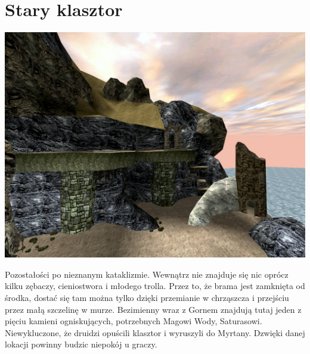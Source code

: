 \documentclass[11pt,polish, openany]{book}
\begin{document}
\section{Stary klasztor}
\begin{center}
	\includegraphics[scale=0.25]{twojastara-klasztor}
\end{center}
Pozostałości po nieznanym kataklizmie. Wewnątrz nie znajduje się nic oprócz kilku zębaczy, cieniostwora i młodego trolla. Przez to, że brama jest zamknięta od środka, dostać się tam można tylko dzięki przemianie w chrząszcza i przejściu przez małą szczelinę w murze. Bezimienny wraz z Gornem znajdują tutaj jeden z pięciu kamieni ogniskujących, potrzebnych Magowi Wody, Saturasowi. Niewykluczone, że druidzi opuścili klasztor i wyruszyli do Myrtany.
Dzwięki danej lokacji powinny budzic niepokój u graczy.
\end{document}
